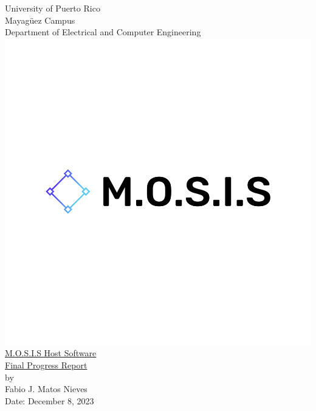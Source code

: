 \begin{titlepage}
  \begin{center}
    \large{University of Puerto Rico\\
    Mayagüez Campus\\
    \vspace{\baselineskip}
    Department of Electrical and Computer Engineering}
  \includegraphics[scale=0.2]{Title_Page/default.png}\\
    \Huge{\underline{M.O.S.I.S Host Software}\\}
    \Huge{\underline{Final Progress Report}\\}
    \vspace{5cm}
    \large by\\
    Fabio J. Matos Nieves\\
    Date: December 8, 2023\\
    \normalsize
  \end{center}
\end{titlepage}
